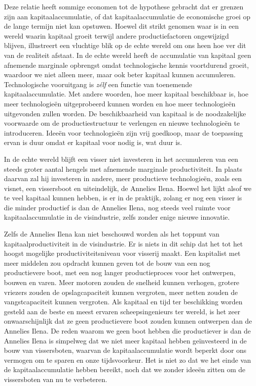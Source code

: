 Deze relatie heeft sommige economen tot de hypothese gebracht dat er grenzen zijn aan kapitaalaccumulatie, of dat kapitaalaccumulatie de economische groei op de lange termijn niet kan opstuwen. Hoewel dit strikt genomen waar is in een wereld waarin kapitaal groeit terwijl andere productiefactoren ongewijzigd blijven, illustreert een vluchtige blik op de echte wereld om ons heen hoe ver dit van de realiteit afstaat. In de echte wereld heeft de accumulatie van kapitaal geen afnemende marginale opbrengst omdat technologische kennis voortdurend groeit, waardoor we niet alleen meer, maar ook beter kapitaal kunnen accumuleren. Technologische vooruitgang is \emph{zélf} een functie van toenemende kapitaalaccumulatie. Met andere woorden, hoe meer kapitaal beschikbaar is, hoe meer technologieën uitgeprobeerd kunnen worden en hoe meer technologieën uitgevonden zullen worden. De beschikbaarheid van kapitaal is de noodzakelijke voorwaarde om de productiestructuur te verlengen en nieuwe technologieën te introduceren. Ideeën voor technologieën zijn vrij goedkoop, maar de toepassing ervan is duur omdat er kapitaal voor nodig is, wat duur is.

In de echte wereld blijft een visser niet investeren in het accumuleren van een steeds groter aantal hengels met afnemende marginale productiviteit. In plaats daarvan zal hij investeren in andere, meer productieve technologieën, zoals een visnet, een vissersboot en uiteindelijk, de Annelies Ilena. Hoewel het lijkt alsof we te veel kapitaal kunnen hebben, is er in de praktijk, zolang er nog een visser is die minder productief is dan de Annelies Ilena, nog steeds veel ruimte voor kapitaalaccumulatie in de visindustrie, zelfs zonder enige nieuwe innovatie.

Zelfs de Annelies Ilena kan niet beschouwd worden als het toppunt van kapitaalproductiviteit in de visindustrie. Er is niets in dit schip dat het tot het hoogst mogelijke productiviteitsniveau voor visserij maakt. Een kapitalist met meer middelen zou opdracht kunnen geven tot de bouw van een nog productievere boot, met een nog langer productieproces voor het ontwerpen, bouwen en varen. Meer motoren zouden de snelheid kunnen verhogen, grotere vriezers zouden de opslagcapaciteit kunnen vergroten, meer netten zouden de vangstcapaciteit kunnen vergroten. Als kapitaal en tijd ter beschikking worden gesteld aan de beste en meest ervaren scheepsingenieurs ter wereld, is het zeer onwaarschijnlijk dat ze geen productievere boot zouden kunnen ontwerpen dan de Annelies Ilena. De reden waarom we geen boot hebben die productiever is dan de Annelies Ilena is simpelweg dat we niet meer kapitaal hebben geïnvesteerd in de bouw van vissersboten, waarvan de kapitaalaccumulatie wordt beperkt door ons vermogen om te sparen en onze tijdsvoorkeur. Het is niet zo dat we het einde van de kapitaalaccumulatie hebben bereikt, noch dat we zonder ideeën zitten om de vissersboten van nu te verbeteren.

